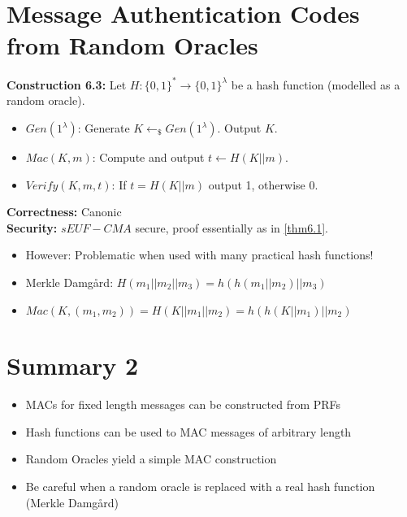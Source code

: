 \section{Message Authentication Codes from Random Oracles}
	\textbf{Construction 6.3:}
	Let $H: \{0,1\}^* \rightarrow \{0,1\}^{\lambda}$ be a hash function (modelled as a random oracle).
	\begin{itemize}
		\item $Gen(1^{\lambda})$: Generate $K \leftarrow_{\$} Gen(1^{\lambda})$. Output $K$.
		\item $Mac(K,m)$: Compute and output $t \leftarrow H(K||m)$.
		\item $Verify(K,m,t)$: If $t = H(K||m)$ output 1, otherwise 0.
	\end{itemize}
	\textbf{Correctness:} Canonic\\
	\textbf{Security:} $sEUF-CMA$ secure, proof essentially as in \cref{thm6.1}.\\
	
	\begin{itemize}
		\item However: Problematic when used with many practical hash functions!
		\item Merkle Damgård: $H(m_1||m_2||m_3) = h(h(m_1||m_2)||m_3)$
		\item $Mac(K,(m_1,m_2)) = H(K||m_1||m_2) = h(h(K||m_1)||m_2)$
	\end{itemize}

\section{Summary 2}
	\begin{itemize}
		\item MACs for fixed length messages can be constructed from PRFs
		\item Hash functions can be used to MAC messages of arbitrary length
		\item Random Oracles yield a simple MAC construction
		\item Be careful when a random oracle is replaced with a real hash function (Merkle Damgård)
	\end{itemize}



